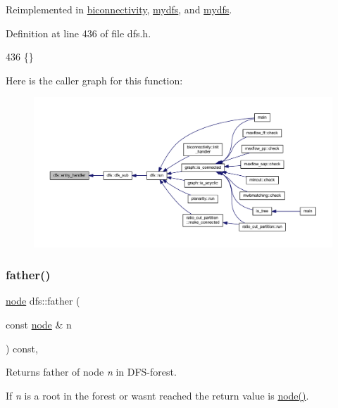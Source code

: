 Reimplemented in \mbox{\hyperlink{classbiconnectivity_acb402f2d144f84429b3cd009121245b0}{biconnectivity}}, \mbox{\hyperlink{classmydfs_af8bf3716d6d01426821692c1bca8970c}{mydfs}}, and \mbox{\hyperlink{classmydfs_af8bf3716d6d01426821692c1bca8970c}{mydfs}}.



Definition at line 436 of file dfs.\+h.


\begin{DoxyCode}
436 \{\}
\end{DoxyCode}
Here is the caller graph for this function\+:
\nopagebreak
\begin{figure}[H]
\begin{center}
\leavevmode
\includegraphics[width=350pt]{classdfs_a6473b0a5d792d9e45c3d32dfdc5b5ffc_icgraph}
\end{center}
\end{figure}
\mbox{\label{classdfs_a3012717ce541b3e56943e2c2c50efdf6}} 
\subsubsection{\texorpdfstring{father()}{father()}}
{\footnotesize\ttfamily \mbox{\hyperlink{classnode}{node}} dfs\+::father (\begin{DoxyParamCaption}\item[{const \mbox{\hyperlink{classnode}{node}} \&}]{n }\end{DoxyParamCaption}) const\hspace{0.3cm}{\ttfamily [inline]}, {\ttfamily [inherited]}}



Returns father of node {\itshape n} in D\+F\+S-\/forest. 

If {\itshape n} is a root in the forest or wasn\textquotesingle{}t reached the return value is {\ttfamily \mbox{\hyperlink{classnode}{node()}}}.


